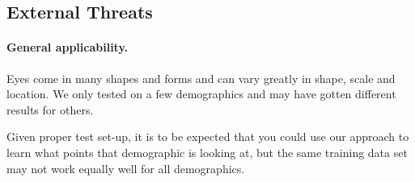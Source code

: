 \subsection{External Threats}
\paragraph{General applicability.}
Eyes come in many shapes and forms and can vary greatly in shape, scale and location.
We only tested on a few demographics and may have gotten different results for others.

Given proper test set-up, it is to be expected that you could use our approach to learn what points that demographic is looking at, but the same training data set may not work equally well for all demographics.